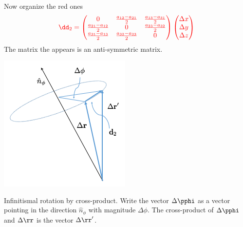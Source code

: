 \documentclass{tufte-book} %
\begin{document}
Now organize the red ones
\begin{equation}
{\color{red}\dd_2  = 
\begin{pmatrix}
0 & \frac{a_{12}-a_{21}}{2} &
    \frac{a_{13}-a_{31}}{2}  \\
\frac{a_{21}-a_{12}}{2} &  0 &
    \frac{a_{23}-a_{32}}{2}  \\
\frac{a_{31}-a_{13}}{2} &
    \frac{a_{32}-a_{23}}{2} & 0 
\end{pmatrix}
\begin{pmatrix}
\Delta x \\ \Delta y  \\ \Delta z
\end{pmatrix}
 }
\label{eq:anti}
\end{equation}
The matrix the appears is an anti-symmetric matrix. 
%
 \begin{marginfigure}
  \includegraphics{figures/rotvec.png}
 \caption{Infinitismal rotation by cross-product. Write the vector $\Delta \pphi$
   as a vector pointing in the direction $\hat{n}_{\phi}$ with
   magnitude $\Delta \phi$.  The cross-product of $\Delta \pphi$ and
   $\Delta \rr$ is the vector $\Delta \rr^{\prime}$. }
  \label{fig:rotvec}
\end{marginfigure}
\end{document}
